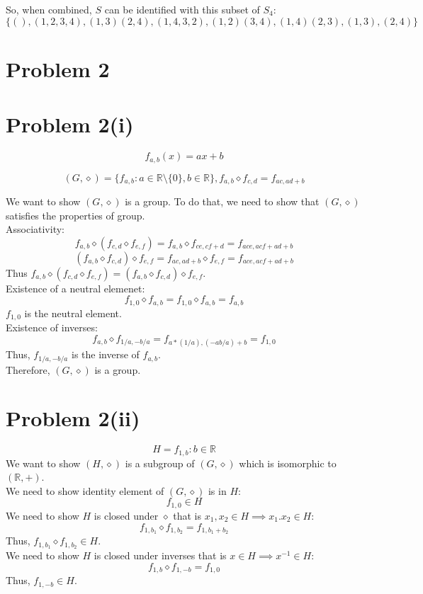 \documentclass{article}
\begin{document}
So, when combined, \(S\) can be identified with this subset of \(S_4\):
\[
   \{ (), (1, 2, 3, 4), (1,3)(2,4), (1,4,3,2), (1,2)(3,4), (1,4)(2,3), (1,3), (2,4) \}
\]

\section*{Problem 2}
\section*{Problem 2(i)}
\[
   f_{a,b}(x) = ax + b
\]

\[
   (G, \diamond) = \{ f_{a,b}: a \in \mathbb{R} \setminus \{0\}, b \in \mathbb{R} \},
   f_{a,b} \diamond f_{c,d} = f_{ac, ad + b}
\]

We want to show \((G, \diamond)\) is a group. To do that, we need to show that \((G, \diamond)\) satisfies the properties of group.
\\
Associativity:
\[
   f_{a,b} \diamond (f_{c,d} \diamond f_{e,f}) = f_{a,b} \diamond f_{ce, cf + d} = f_{ace, acf + ad + b}
\]
\[
   (f_{a,b} \diamond f_{c,d}) \diamond f_{e,f} = f_{ac, ad + b} \diamond f_{e,f} = f_{ace, acf + ad + b}
\]
Thus \(f_{a,b} \diamond (f_{c,d} \diamond f_{e,f}) = (f_{a,b} \diamond f_{c,d}) \diamond f_{e,f}\).
\\
Existence of a neutral elemenet:
\[
   f_{1,0} \diamond f_{a,b} = f_{1,0} \diamond f_{a,b} = f_{a, b}
\]
\(f_{1,0}\) is the neutral element.
\\
Existence of inverses:
\[
   f_{a,b} \diamond f_{1/a, -b/a} = f_{a * (1/a), (-ab/a) + b} = f_{1, 0}
\]
Thus, \(f_{1/a, -b/a}\) is the inverse of \(f_{a,b}\).
\\
Therefore, \((G, \diamond)\) is a group.

\section*{Problem 2(ii)}
\[
   H = {f_{1,b} : b \in \mathbb{R}}
\]
We want to show \((H, \diamond)\) is a subgroup of \((G, \diamond)\) which is isomorphic to \((\mathbb{R}, +)\). \\
We need to show identity element of \((G, \diamond)\) is in \(H\):
\[
   f_{1,0} \in H
\]
We need to show \(H\) is closed under \(\diamond\) that is \(x_1,x_2 \in H \implies x_1 .x_2 \in H\):
\[
   f_{1,b_1} \diamond f_{1,b_2} = f_{1, b_1 + b_2}
\]
Thus, \(f_{1,b_1} \diamond f_{1,b_2} \in H\).
\\
We need to show \(H\) is closed under inverses that is \(x \in H \implies x^{-1} \in H\):
\[
   f_{1,b} \diamond f_{1,-b} = f_{1, 0}
\]
Thus, \(f_{1,-b} \in H\).
\\
\end{document}
